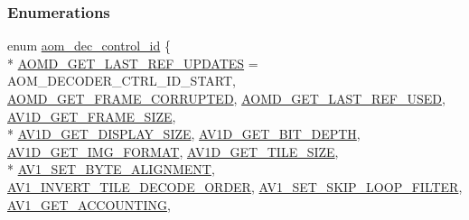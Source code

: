 \subsubsection*{Enumerations}
\begin{DoxyCompactItemize}
\item 
enum \hyperlink{group__aom__decoder_ga3865fd4b3192489baa9a5c3632ebe97b}{aom\+\_\+dec\+\_\+control\+\_\+id} \{ \\*
\hyperlink{group__aom__decoder_gga3865fd4b3192489baa9a5c3632ebe97babab96509cdce01ed1cf027185da4d874}{A\+O\+M\+D\+\_\+\+G\+E\+T\+\_\+\+L\+A\+S\+T\+\_\+\+R\+E\+F\+\_\+\+U\+P\+D\+A\+T\+ES} = A\+O\+M\+\_\+\+D\+E\+C\+O\+D\+E\+R\+\_\+\+C\+T\+R\+L\+\_\+\+I\+D\+\_\+\+S\+T\+A\+RT, 
\hyperlink{group__aom__decoder_gga3865fd4b3192489baa9a5c3632ebe97ba159ddb748cb69956226b7c13e3890ff6}{A\+O\+M\+D\+\_\+\+G\+E\+T\+\_\+\+F\+R\+A\+M\+E\+\_\+\+C\+O\+R\+R\+U\+P\+T\+ED}, 
\hyperlink{group__aom__decoder_gga3865fd4b3192489baa9a5c3632ebe97ba03f15fd9a3044ca1a1707e12b6a4588b}{A\+O\+M\+D\+\_\+\+G\+E\+T\+\_\+\+L\+A\+S\+T\+\_\+\+R\+E\+F\+\_\+\+U\+S\+ED}, 
\hyperlink{group__aom__decoder_gga3865fd4b3192489baa9a5c3632ebe97ba175c454a7adf2d3927a0e979b4a2b07b}{A\+V1\+D\+\_\+\+G\+E\+T\+\_\+\+F\+R\+A\+M\+E\+\_\+\+S\+I\+ZE}, 
\\*
\hyperlink{group__aom__decoder_gga3865fd4b3192489baa9a5c3632ebe97ba592a5d1390204d743ddfe7bfe8ef177c}{A\+V1\+D\+\_\+\+G\+E\+T\+\_\+\+D\+I\+S\+P\+L\+A\+Y\+\_\+\+S\+I\+ZE}, 
\hyperlink{group__aom__decoder_gga3865fd4b3192489baa9a5c3632ebe97bace55b4f6d152f2f0d29f70ab918cba4f}{A\+V1\+D\+\_\+\+G\+E\+T\+\_\+\+B\+I\+T\+\_\+\+D\+E\+P\+TH}, 
\hyperlink{group__aom__decoder_gga3865fd4b3192489baa9a5c3632ebe97bacd7229e5fb766670fe995739931c2ee3}{A\+V1\+D\+\_\+\+G\+E\+T\+\_\+\+I\+M\+G\+\_\+\+F\+O\+R\+M\+AT}, 
\hyperlink{group__aom__decoder_gga3865fd4b3192489baa9a5c3632ebe97ba4d9799d9e520785870b8d1f73a19c3c4}{A\+V1\+D\+\_\+\+G\+E\+T\+\_\+\+T\+I\+L\+E\+\_\+\+S\+I\+ZE}, 
\\*
\hyperlink{group__aom__decoder_gga3865fd4b3192489baa9a5c3632ebe97babb0f1c97c6092ebed96ca9800e05157e}{A\+V1\+\_\+\+S\+E\+T\+\_\+\+B\+Y\+T\+E\+\_\+\+A\+L\+I\+G\+N\+M\+E\+NT}, 
\hyperlink{group__aom__decoder_gga3865fd4b3192489baa9a5c3632ebe97bac19ffcb187b1e1b5eee18499a97f69d2}{A\+V1\+\_\+\+I\+N\+V\+E\+R\+T\+\_\+\+T\+I\+L\+E\+\_\+\+D\+E\+C\+O\+D\+E\+\_\+\+O\+R\+D\+ER}, 
\hyperlink{group__aom__decoder_gga3865fd4b3192489baa9a5c3632ebe97ba45b658bd6518cfd30c56b13e98ab168a}{A\+V1\+\_\+\+S\+E\+T\+\_\+\+S\+K\+I\+P\+\_\+\+L\+O\+O\+P\+\_\+\+F\+I\+L\+T\+ER}, 
\hyperlink{group__aom__decoder_gga3865fd4b3192489baa9a5c3632ebe97bab7332818193596356a580c83ecb12a66}{A\+V1\+\_\+\+G\+E\+T\+\_\+\+A\+C\+C\+O\+U\+N\+T\+I\+NG}, 

\end{DoxyCompactItemize}

